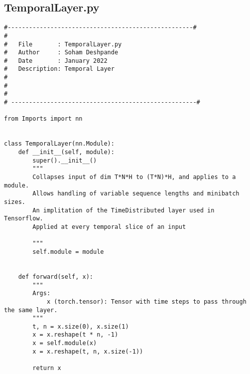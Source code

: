 \documentclass{article}
\begin{document}
\subsection{TemporalLayer.py}
\begin{lstlisting}
#----------------------------------------------------#
#
#   File       : TemporalLayer.py
#   Author     : Soham Deshpande
#   Date       : January 2022
#   Description: Temporal Layer
#
#
#
# ----------------------------------------------------#

from Imports import nn


class TemporalLayer(nn.Module):
    def __init__(self, module):
        super().__init__()
        """
        Collapses input of dim T*N*H to (T*N)*H, and applies to a module.
        Allows handling of variable sequence lengths and minibatch sizes.
        An implitation of the TimeDistributed layer used in Tensorflow.
        Applied at every temporal slice of an input

        """
        self.module = module


    def forward(self, x):
        """
        Args:
            x (torch.tensor): Tensor with time steps to pass through the same layer.
        """
        t, n = x.size(0), x.size(1)
        x = x.reshape(t * n, -1)
        x = self.module(x)
        x = x.reshape(t, n, x.size(-1))

        return x




\end{lstlisting}
\clearpage
\end{document}
